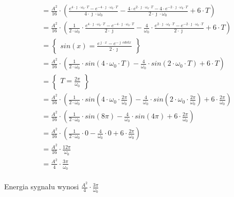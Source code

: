 \begin{task}
\begin{align*}
&=\frac{A^2}{16} \cdot \left( 
\frac{e^{4 \cdot \jmath \cdot \omega_0 \cdot T} - e^{-4 \cdot \jmath \cdot \omega_0 \cdot T}}{4 \cdot \jmath \cdot \omega_0} 
- \frac{4 \cdot e^{2 \cdot \jmath \cdot \omega_0 \cdot T} - 4 \cdot e^{-2 \cdot \jmath \cdot \omega_0 \cdot T}}{2 \cdot \jmath \cdot \omega_0}
+ 6 \cdot T \right)\\
&=\frac{A^2}{16} \cdot \left( \frac{1}{2 \cdot \omega_0} \cdot
\frac{e^{4 \cdot \jmath \cdot \omega_0 \cdot T} - e^{-4 \cdot \jmath \cdot \omega_0 \cdot T}}{2 \cdot \jmath} 
- \frac{4}{\omega_0} \cdot \frac{e^{2 \cdot \jmath \cdot \omega_0 \cdot T} - e^{-2 \cdot \jmath \cdot \omega_0 \cdot T}}{2 \cdot \jmath}
+ 6 \cdot T \right)\\
&=\begin{Bmatrix}
sin(x)=\frac{e^{\jmath \cdot x} - e^{-\jmath \ cdot x}}{2\cdot \jmath}
\end{Bmatrix}\\
&=\frac{A^2}{16} \cdot \left( \frac{1}{2 \cdot \omega_0} \cdot
sin\left(4 \cdot \omega_0 \cdot T\right)
- \frac{4}{\omega_0} \cdot sin\left(2 \cdot \omega_0 \cdot T\right)
+ 6 \cdot T \right)\\
&=\begin{Bmatrix}
T=\frac{2\pi}{\omega_0}
\end{Bmatrix}\\
&=\frac{A^2}{16} \cdot \left( \frac{1}{2 \cdot \omega_0} \cdot
sin\left(4 \cdot \omega_0 \cdot \frac{2\pi}{\omega_0}\right)
- \frac{4}{\omega_0} \cdot sin\left(2 \cdot \omega_0 \cdot \frac{2\pi}{\omega_0}\right)
+ 6 \cdot \frac{2\pi}{\omega_0} \right)\\
&=\frac{A^2}{16} \cdot \left( \frac{1}{2 \cdot \omega_0} \cdot
sin\left(8 \pi\right)
- \frac{4}{\omega_0} \cdot sin\left(4\pi\right)
+ 6 \cdot \frac{2\pi}{\omega_0} \right)\\
&=\frac{A^2}{16} \cdot \left( \frac{1}{2 \cdot \omega_0} \cdot 0
- \frac{4}{\omega_0} \cdot 0 + 6 \cdot \frac{2\pi}{\omega_0} \right)\\
&=\frac{A^2}{16} \cdot \frac{12\pi}{\omega_0}\\
&=\frac{A^2}{4} \cdot \frac{3\pi}{\omega_0}\\
\end{align*}

Energia sygnału wynosi $\frac{A^2}{4} \cdot \frac{3\pi}{\omega_0}$
\end{task}